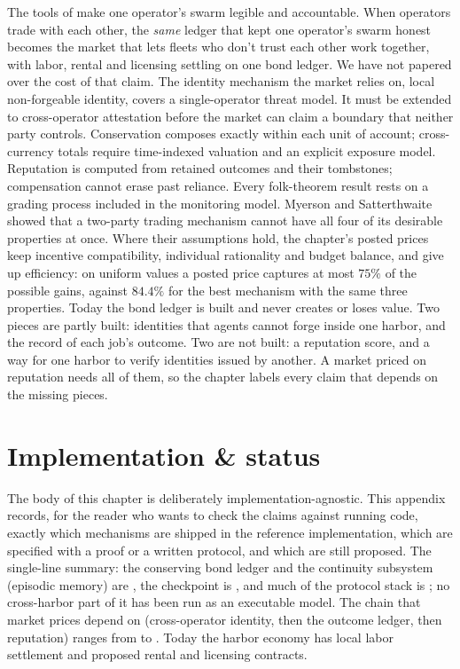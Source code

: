 \documentclass[11pt,a4paper]{article}
\theoremstyle{definition}
\theoremstyle{definition}
\theoremstyle{remark}
\begin{document}
The tools of  make one operator's swarm
legible and accountable. When operators trade with each other, the \emph{same} ledger that
kept one operator's swarm honest becomes the market that lets fleets who don't trust
each other work together, with labor, rental and licensing settling on one bond ledger. We have not papered
over the cost of that claim. The identity mechanism the market relies on,
local non-forgeable identity, covers a single-operator threat model. It must be
extended to cross-operator attestation before the market can claim a boundary
that neither party controls. Conservation composes exactly within each unit of account;
cross-currency totals require time-indexed valuation and an explicit exposure model. Reputation is
computed from retained outcomes and their tombstones; compensation cannot erase past reliance. Every
folk-theorem result rests on a grading process included in the monitoring model.
Myerson and Satterthwaite showed that a two-party trading mechanism cannot
have all four of its desirable properties at once. Where their assumptions
hold, the chapter's posted prices keep incentive compatibility, individual
rationality and budget balance, and give up efficiency: on uniform values a
posted price captures at most $75\%$ of the possible gains, against $84.4\%$
for the best mechanism with the same three properties. Today the bond ledger is built and never creates or
loses value. Two pieces are partly built: identities that agents cannot forge
inside one harbor, and the record of each job's outcome. Two are not built: a
reputation score, and a way for one harbor to verify identities issued by
another. A market priced on reputation needs all of them, so the chapter
labels every claim that depends on the missing pieces.

\appendix

\section{Implementation \& status}\label{app:impl}\label{app:fh-mech}

The body of this chapter is deliberately implementation-agnostic. This appendix
records, for the reader who wants to check the claims against running code, exactly
which mechanisms are shipped in the reference implementation, which are specified
with a proof or a written protocol, and which are still proposed. The single-line
summary: the conserving bond ledger and the continuity subsystem (episodic
memory) are \Built{}, the checkpoint is \BuiltWeak{}, and much of the protocol
stack is \Designed{}; no cross-harbor part of it has been run as an
executable model. The chain that market prices depend
on (cross-operator identity, then the outcome ledger, then reputation) ranges
from \BuiltWeak{} to \Vision{}. Today the harbor economy has local labor
settlement and proposed rental and licensing contracts.
\end{document}
